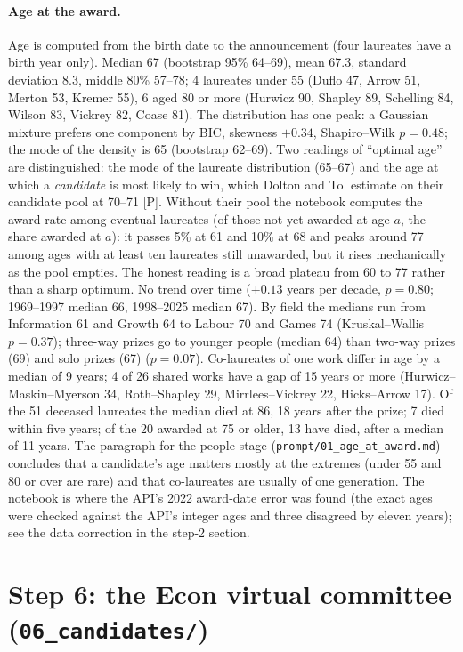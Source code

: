 \documentclass[11pt,a4paper]{article}
\newcommand{\code}[1]{\texttt{#1}}
\begin{document}
\paragraph{Age at the award.} Age is computed from the birth date to the announcement (four laureates have a birth
year only). Median 67 (bootstrap 95\% 64--69), mean 67.3, standard deviation 8.3, middle 80\% 57--78; 4 laureates under
55 (Duflo 47, Arrow 51, Merton 53, Kremer 55), 6 aged 80 or more (Hurwicz 90, Shapley 89, Schelling 84, Wilson 83,
Vickrey 82, Coase 81). The distribution has one peak: a Gaussian mixture prefers one component by BIC, skewness
$+0.34$, Shapiro--Wilk $p = 0.48$; the mode of the density is 65 (bootstrap 62--69). Two readings of ``optimal age''
are distinguished: the mode of the laureate distribution (65--67) and the age at which a \emph{candidate} is most likely
to win, which Dolton and Tol estimate on their candidate pool at 70--71 [P]. Without their pool the notebook computes
the award rate among eventual laureates (of those not yet awarded at age $a$, the share awarded at $a$): it passes 5\%
at 61 and 10\% at 68 and peaks around 77 among ages with at least ten laureates still unawarded, but it rises
mechanically as the pool empties. The honest reading is a broad plateau from 60 to 77 rather than a sharp optimum.
No trend over time ($+0.13$ years per decade, $p = 0.80$; 1969--1997 median 66, 1998--2025 median 67). By field the
medians run from Information 61 and Growth 64 to Labour 70 and Games 74 (Kruskal--Wallis $p = 0.37$); three-way
prizes go to younger people (median 64) than two-way prizes (69) and solo prizes (67) ($p = 0.07$). Co-laureates of one
work differ in age by a median of 9 years; 4 of 26 shared works have a gap of 15 years or more (Hurwicz--Maskin--Myerson
34, Roth--Shapley 29, Mirrlees--Vickrey 22, Hicks--Arrow 17). Of the 51 deceased laureates the median died at 86, 18
years after the prize; 7 died within five years; of the 20 awarded at 75 or older, 13 have died, after a median of 11
years. The paragraph for the people stage (\code{prompt/01\_age\_at\_award.md}) concludes that a candidate's age
matters mostly at the extremes (under 55 and 80 or over are rare) and that co-laureates are usually of one generation.
The notebook is where the API's 2022 award-date error was found (the exact ages were checked against the API's
integer ages and three disagreed by eleven years); see the data correction in the step-2 section.

\section{Step 6: the Econ virtual committee (\code{06\_candidates/})}
\end{document}
